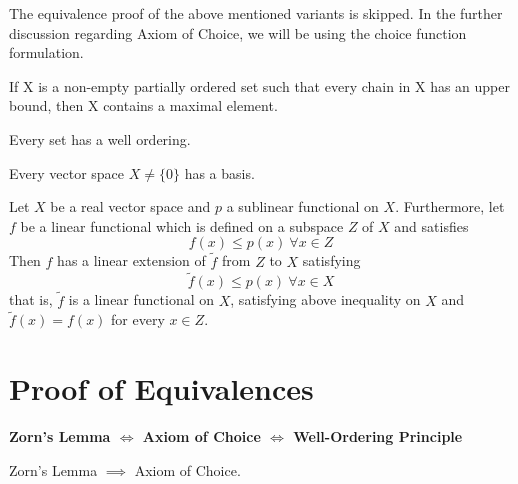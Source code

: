 \documentclass[11pt,a4paper]{article}
\begin{document}
\begin{remark}
    The equivalence proof of the above mentioned variants is skipped. In the further discussion regarding Axiom of Choice, we will be using the choice function formulation.
\end{remark}

\begin{zl}
    If X is a non-empty partially ordered set such that every chain in X has an upper bound, then X contains a maximal element.
\end{zl}

\begin{wop}
 Every set has a well ordering.
\end{wop}

\begin{ehb}
    Every vector space $X\neq \{0\}$ has a basis.
\end{ehb}

\begin{hbt}
 Let $X$ be a real vector space and $p$ a sublinear functional on $X$. Furthermore, let $f$ be a linear functional which is defined on a subspace $Z$ of $X$ and satisfies 
 \begin{equation*}
     f(x) \leq p(x)\ \forall x \in Z
 \end{equation*}
 Then $f$ has a linear extension of $\tilde{f}$ from $Z$ to $X$ satisfying
 \begin{equation*}
     \tilde{f}(x) \leq p(x)\ \forall x \in X 
 \end{equation*}
 that is, $\tilde{f}$ is a linear functional on $X$, satisfying above inequality on $X$ and $\tilde{f}(x) = f(x)$ for every $x \in Z$.
\end{hbt}

\section{Proof of Equivalences}

\textbf{Zorn's Lemma $\iff$ Axiom of Choice $\iff$ Well-Ordering Principle}

\begin{theorem}\label{thm:zl_ac}
    Zorn's Lemma $\implies$ Axiom of Choice.
\end{theorem}
\end{document}
